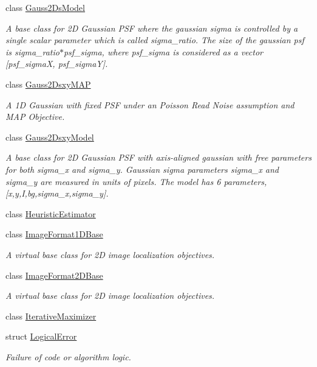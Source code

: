 \begin{DoxyCompactItemize}
class \hyperlink{classmappel_1_1Gauss2DsModel}{Gauss2\+Ds\+Model}
\begin{DoxyCompactList}\small\item\em A base class for 2D Gaussian P\+SF where the gaussian sigma is controlled by a single scalar parameter which is called sigma\+\_\+ratio. The size of the gaussian psf is sigma\+\_\+ratio$\ast$psf\+\_\+sigma, where psf\+\_\+sigma is considered as a vector \mbox{[}psf\+\_\+sigmaX, psf\+\_\+sigmaY\mbox{]}. \end{DoxyCompactList}\item 
class \hyperlink{classmappel_1_1Gauss2DsxyMAP}{Gauss2\+Dsxy\+M\+AP}
\begin{DoxyCompactList}\small\item\em A 1D Gaussian with fixed P\+SF under an Poisson Read Noise assumption and M\+AP Objective. \end{DoxyCompactList}\item 
class \hyperlink{classmappel_1_1Gauss2DsxyModel}{Gauss2\+Dsxy\+Model}
\begin{DoxyCompactList}\small\item\em A base class for 2D Gaussian P\+SF with axis-\/aligned gaussian with free parameters for both sigma\+\_\+x and sigma\+\_\+y. Gaussian sigma parameters sigma\+\_\+x and sigma\+\_\+y are measured in units of pixels. The model has 6 parameters, \mbox{[}x,y,I,bg,sigma\+\_\+x,sigma\+\_\+y\mbox{]}. \end{DoxyCompactList}\item 
class \hyperlink{classmappel_1_1HeuristicEstimator}{Heuristic\+Estimator}
\item 
class \hyperlink{classmappel_1_1ImageFormat1DBase}{Image\+Format1\+D\+Base}
\begin{DoxyCompactList}\small\item\em A virtual base class for 2D image localization objectives. \end{DoxyCompactList}\item 
class \hyperlink{classmappel_1_1ImageFormat2DBase}{Image\+Format2\+D\+Base}
\begin{DoxyCompactList}\small\item\em A virtual base class for 2D image localization objectives. \end{DoxyCompactList}\item 
class \hyperlink{classmappel_1_1IterativeMaximizer}{Iterative\+Maximizer}
\item 
struct \hyperlink{structmappel_1_1LogicalError}{Logical\+Error}
\begin{DoxyCompactList}\small\item\em Failure of code or algorithm logic. \end{DoxyCompactList}\item 

\end{DoxyCompactItemize}
